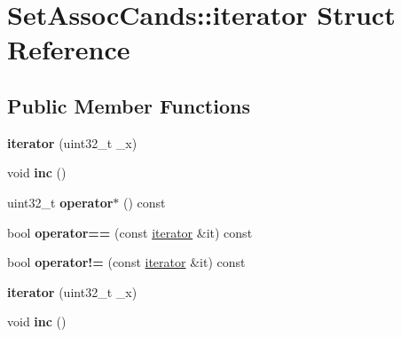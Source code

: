 \hypertarget{structSetAssocCands_1_1iterator}{\section{Set\-Assoc\-Cands\-:\-:iterator Struct Reference}
\label{structSetAssocCands_1_1iterator}
}
\subsection*{Public Member Functions}
\begin{DoxyCompactItemize}
\item 
\hypertarget{structSetAssocCands_1_1iterator_a7550aa1f23e9c054d56bd0a407802407}{{\bfseries iterator} (uint32\-\_\-t \-\_\-x)}\label{structSetAssocCands_1_1iterator_a7550aa1f23e9c054d56bd0a407802407}

\item 
\hypertarget{structSetAssocCands_1_1iterator_a6f5e0190afa66a9ebc293b8133313c0f}{void {\bfseries inc} ()}\label{structSetAssocCands_1_1iterator_a6f5e0190afa66a9ebc293b8133313c0f}

\item 
\hypertarget{structSetAssocCands_1_1iterator_a4d450ed0e6772ec671a108feedd60cde}{uint32\-\_\-t {\bfseries operator$\ast$} () const }\label{structSetAssocCands_1_1iterator_a4d450ed0e6772ec671a108feedd60cde}

\item 
\hypertarget{structSetAssocCands_1_1iterator_a4bbcff037b552d5c3d688d99dc5213e4}{bool {\bfseries operator==} (const \hyperlink{structSetAssocCands_1_1iterator}{iterator} \&it) const }\label{structSetAssocCands_1_1iterator_a4bbcff037b552d5c3d688d99dc5213e4}

\item 
\hypertarget{structSetAssocCands_1_1iterator_a555a0a7326ba2905645da079a6ede142}{bool {\bfseries operator!=} (const \hyperlink{structSetAssocCands_1_1iterator}{iterator} \&it) const }\label{structSetAssocCands_1_1iterator_a555a0a7326ba2905645da079a6ede142}

\item 
\hypertarget{structSetAssocCands_1_1iterator_a7550aa1f23e9c054d56bd0a407802407}{{\bfseries iterator} (uint32\-\_\-t \-\_\-x)}\label{structSetAssocCands_1_1iterator_a7550aa1f23e9c054d56bd0a407802407}

\item 
\hypertarget{structSetAssocCands_1_1iterator_a6f5e0190afa66a9ebc293b8133313c0f}{void {\bfseries inc} ()}\label{structSetAssocCands_1_1iterator_a6f5e0190afa66a9ebc293b8133313c0f}


\end{DoxyCompactItemize}
